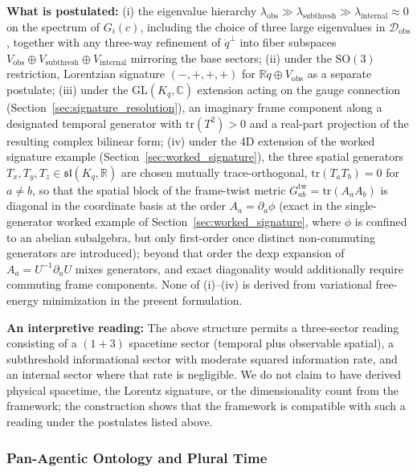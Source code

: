 \documentclass[11pt]{article}
\begin{document}
\begin{center}
{\begin{minipage}{0.9\columnwidth}
\textbf{What is postulated:} (i) the eigenvalue hierarchy $\lambda_{\text{obs}} \gg \lambda_{\text{subthresh}} \gg \lambda_{\text{internal}} \approx 0$ on the spectrum of $G_i(c)$, including the choice of three large eigenvalues in $\mathcal{D}_{\text{obs}}$, together with any three-way refinement of $\dot{q}^\perp$ into fiber subspaces $V_{\text{obs}} \oplus V_{\text{subthresh}} \oplus V_{\text{internal}}$ mirroring the base sectors; (ii) under the $\mathrm{SO}(3)$ restriction, Lorentzian signature $(-,+,+,+)$ for $\mathbb{R}\dot{q} \oplus V_{\text{obs}}$ as a separate postulate; (iii) under the $\mathrm{GL}(K_q, \mathbb{C})$ extension acting on the gauge connection (Section~\ref{sec:signature_resolution}), an imaginary frame component along a designated temporal generator with $\mathrm{tr}(T^2) > 0$ and a real-part projection of the resulting complex bilinear form; (iv) under the 4D extension of the worked signature example (Section~\ref{sec:worked_signature}), the three spatial generators $T_x, T_y, T_z \in \mathfrak{sl}(K_q, \mathbb{R})$ are chosen mutually trace-orthogonal, $\mathrm{tr}(T_a T_b) = 0$ for $a \neq b$, so that the spatial block of the frame-twist metric $G_{ab}^{\mathrm{tw}} = \mathrm{tr}(A_a A_b)$ is diagonal in the coordinate basis at the order $A_a = \partial_a \phi$ (exact in the single-generator worked example of Section~\ref{sec:worked_signature}, where $\phi$ is confined to an abelian subalgebra, but only first-order once distinct non-commuting generators are introduced); beyond that order the $\mathrm{dexp}$ expansion of $A_a = U^{-1}\partial_a U$ mixes generators, and exact diagonality would additionally require commuting frame components. None of (i)--(iv) is derived from variational free-energy minimization in the present formulation.

\textbf{An interpretive reading:} The above structure permits a three-sector reading consisting of a $(1+3)$ spacetime sector (temporal plus observable spatial), a subthreshold informational sector with moderate squared information rate, and an internal sector where that rate is negligible. We do not claim to have derived physical spacetime, the Lorentz signature, or the dimensionality count from the framework; the construction shows that the framework is compatible with such a reading under the postulates listed above.
\end{minipage}}
\end{center}

\subsubsection{Pan-Agentic Ontology and Plural Time}
\end{document}
